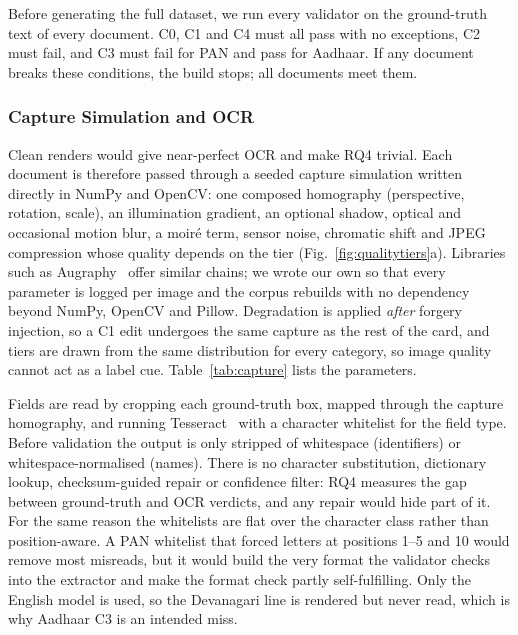 \documentclass[12pt]{article}
\begin{document}
Before generating the full dataset, we run every validator on the ground-truth text of every document. C0, C1 and C4 must all pass with no exceptions, C2 must fail, and C3 must fail for PAN and pass for Aadhaar. If any document breaks these conditions, the build stops; all \dsDocuments{} documents meet them.


\subsubsection{Capture Simulation and OCR}
\label{subsec:degrade}
\label{subsec:ocr}

Clean renders would give near-perfect OCR and make RQ4 trivial. Each
document is therefore passed through a seeded capture simulation
written directly in NumPy and OpenCV: one composed homography
(perspective, rotation, scale), an illumination gradient, an optional
shadow, optical and occasional motion blur, a moir\'e term, sensor
noise, chromatic shift and JPEG compression whose quality depends on the
tier (Fig.~\ref{fig:qualitytiers}\nocite{wilson}a). Libraries such as
Augraphy~\cite{augraphy} offer similar chains; we wrote our own so that
every parameter is logged per image and the corpus rebuilds with no
dependency beyond NumPy, OpenCV and Pillow. Degradation is applied
\emph{after} forgery injection, so a C1 edit undergoes the same capture
as the rest of the card, and tiers are drawn from the same distribution
for every category, so image quality cannot act as a label cue.
Table~\ref{tab:capture} lists the parameters.



Fields are read by cropping each ground-truth box, mapped through the
capture homography, and running Tesseract~\cite{tesseract} with a
character whitelist for the field type. Before validation the output is
only stripped of whitespace (identifiers) or whitespace-normalised
(names). There is no character substitution, dictionary lookup,
checksum-guided repair or confidence filter: RQ4 measures the gap
between ground-truth and OCR verdicts, and any repair would hide part of
it. For the same
reason the whitelists are flat over the character class rather than
position-aware. A PAN whitelist that forced letters at positions 1--5
and 10 would remove most misreads, but it would build the very format
the validator checks into the extractor and make the format check
partly self-fulfilling. Only the English model is used, so the
Devanagari line is rendered but never read, which is why Aadhaar C3 is
an intended miss.
\end{document}
